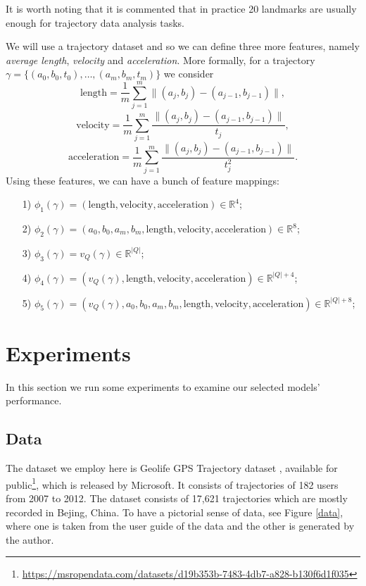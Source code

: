 \documentclass[11pt]{myclass}
\begin{document}
It is worth noting that it is commented that in practice 20 landmarks are usually enough for trajectory data analysis tasks. 

We will use a trajectory dataset and so we can define three more features, namely {\it average length}, {\it velocity} and {\it acceleration}. More formally, for a trajectory $\gamma = \{(a_0, b_0, t_0), \ldots, (a_m, b_m, t_m)\}$ we consider 
\[
\displaystyle \text{length} = \frac{1}{m} \sum_{j=1}^m \|(a_j, b_j) - (a_{j-1}, b_{j-1})\|,
\]
\[\text{velocity}= \frac{1}{m} \sum_{j=1}^m \frac{\|(a_j, b_j) - (a_{j-1}, b_{j-1})\|}{t_j},\]
\[\text{acceleration} = \frac{1}{m} \sum_{j=1}^m \frac{\|(a_j, b_j) - (a_{j-1}, b_{j-1})\|}{t_j^2}.\]
Using these features, we can have a bunch of feature mappings:
\begin{itemize}
\item[1)] $\phi_1(\gamma) = (\text{length}, \text{velocity}, \text{acceleration}) \in \mathbb{R}^4$;

\item[2)] $\phi_2(\gamma) = (a_0, b_0, a_m, b_m, \text{length}, \text{velocity}, \text{acceleration}) \in \mathbb{R}^{8}$;

\item[3)] $\phi_3(\gamma) = v_Q(\gamma) \in \mathbb{R}^{|Q|}$;

\item[4)] $\phi_4(\gamma) = (v_Q(\gamma), \text{length}, \text{velocity}, \text{acceleration}) \in \mathbb{R}^{|Q|+4}$;

\item[5)] $\phi_5(\gamma) = (v_Q(\gamma), a_0, b_0, a_m, b_m, \text{length}, \text{velocity}, \text{acceleration}) \in \mathbb{R}^{|Q|+8}$;
\end{itemize}



\section{Experiments} \label{experiments}

In this section we run some experiments to examine our selected models' performance. 

\subsection{Data} \label{dataset}
The dataset we employ here is Geolife GPS Trajectory dataset \cite{geolife-gps-trajectory-dataset-user-guide}, available for public\footnote{\url{https://msropendata.com/datasets/d19b353b-7483-4db7-a828-b130f6d1f035}}, which is released by Microsoft. It consists of trajectories of 182 users from 2007 to 2012. The dataset consists of 17,621 trajectories which are mostly recorded in Bejing, China. To have a pictorial sense of data, see Figure \ref{data}, where one is taken from the user guide of the data and the other is generated by the author.  
\end{document}

